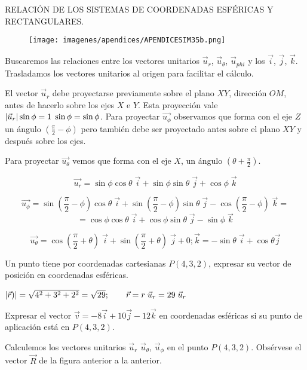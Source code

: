 RELACIÓN DE LOS SISTEMAS DE COORDENADAS ESFÉRICAS Y RECTANGULARES.

\begin{figure}[H]
	\centering
	\texttt{[image: imagenes/apendices/APENDICESIM35b.png]}
\end{figure}
Buscaremos las relaciones entre los vectores unitarios $\vec u_{r}$, $\vec u_{\theta}$, $\vec u_{phi}$ y los $\vec i$, $\vec j$, $\vec k$. Trasladamos los vectores unitarios al origen para facilitar el cálculo.

El vector $\vec u_{r}$ debe proyectarse previamente sobre el plano $XY$, dirección $OM$, antes de hacerlo sobre los ejes $X$ e $Y$. Esta proyección vale $\abs{\vec u_r} \sin \phi=1\; \sin \phi=\sin \phi$. Para proyectar $\vec {u_{\phi}}$  observamos que forma con el eje $Z$ un ángulo $(\frac \pi 2 - \phi)$ pero también debe ser proyectado antes sobre el plano $XY$ y después sobre los ejes.

Para proyectar $\vec {u_{\theta}}$ vemos que forma con el eje $X$, un ángulo $(\theta + \frac \pi 2)$.


$$\vec {u_r}=\sin \phi \cos \theta \;\vec i + \sin \phi \sin \theta \;\vec j + \cos \phi \; \vec k$$

$$\vec {u_{\phi}}=\sin (\frac \pi 2 -\phi) \cos \theta \; \vec i +\sin (\frac \pi 2 -\phi) \sin \theta \; \vec j - \cos (\frac \pi 2 - \phi)\; \vec k =$$ 
$$= \cos \phi \cos \theta \; \vec i + \cos \phi \sin \theta \; \vec j - \sin \phi \; \vec k$$

$$\vec {u_{\theta}}= \cos (\frac \pi 2 + \theta)\; \vec i + \sin (\frac \pi 2 + \theta)\; \vec j+0; \vec k = -\sin \theta \; \vec i + \cos \theta \vec j $$

\begin{ejem}
	Un punto tiene por coordenadas cartesianas $P(4,3,2)$, expresar su vector de posición en coordenadas esféricas.
\end{ejem}

$\abs{\vec r)}=\sqrt{4^2+3^2+2^2}=\sqrt{29};\qquad \vec r = r\; \vec u_r=29\; \vec u_r$

\begin{ejem}
	Expresar el vector $\vec v=-8\vec i+10 \vec j - 12 \vec k$ en coordenadas esféricas si su punto de aplicación está en $P(4,3,2)$.
\end{ejem}

Calculemos los vectores unitarios $\vec u_{r}$ $\vec u_{\theta}$, $\vec u_{\phi}$ en el punto $P(4,3,2)$. Obsérvese el vector $\vec R$ de la figura anterior a la anterior.

